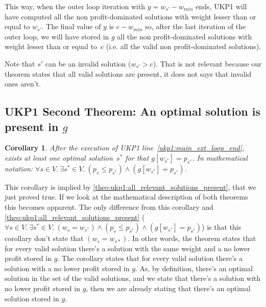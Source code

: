 \documentclass[12pt]{article}
\newtheorem{corollary}{Corollary}
\begin{document}
This way, when the outer loop iteration with \(y = w_{s'}-w_{min}\) ends, UKP1 will have computed all the non profit-dominated solutions with weight lesser than or equal to \(w_{s'}\). The final value of \(y\) is \(c-w_{min}\) so, after the last iteration of the outer loop, we will have stored in \(g\) all the non profit-dominated solutions with weight lesser than or equal to~\(c\) (i.e. all the valid non profit-dominated solutions).

Note that \(s'\) can be an invalid solution (\(w_{s'} > c\)). That is not relevant because our theorem states that all valid solutions are present, it does not says that invalid ones aren't.

\subsection{UKP1 Second Theorem: An optimal solution is present in \(g\)}

\begin{corollary}\label{theo:ukp1:opt_is_present}
After the execution of UKP1 line~\ref{ukp1:main_ext_loop_end}, exists at least one optimal solution~\(s^*\) for that \(g[w_{s^*}] = p_{s^*}\). In mathematical notation: \(\forall s \in V.~\exists s^* \in V.~(p_{s} \leq p_{s^*}) \land (g[w_{s^*}] = p_{s^*})\).
\end{corollary}

This corollary is implied by \autoref{theo:ukp1:all_relevant_solutions_present}, that we just proved true. If we look at the mathematical description of both theorems this becomes apparent. The only difference from this corollary and \autoref{theo:ukp1:all_relevant_solutions_present} (\(\forall s \in V.~\exists s^* \in V.~(w_s = w_{s^*}) \land (p_s \leq p_{s^*}) \land (g[w_{s^*}] = p_{s^*})\)) is that this corollary don't state that \((w_s = w_{s*})\). In other words, the theorem states that for every valid solution there's a solution with the same weight and a no lower profit stored in \(g\). The corollary states that for every valid solution there's a solution with a no lower profit stored in \(g\). As, by definition, there's an optimal solution in the set of the valid solutions, and we state that there's a solution with no lower profit stored in \(g\), then we are already stating that there's an optimal solution stored in \(g\).
\end{document}
